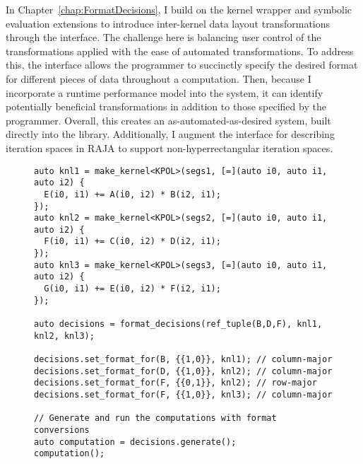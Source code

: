 In Chapter~\ref{chap:FormatDecisions}, I build on the kernel wrapper and symbolic evaluation extensions to introduce inter-kernel data layout transformations through the \FormatDecisions{} interface.
The challenge here is balancing user control of the transformations applied with the ease of automated transformations.
To address this, the interface allows the programmer to succinctly specify the desired format for different pieces of data throughout a computation.
Then, because I incorporate a runtime performance model into the system, it can identify potentially beneficial transformations in addition to those specified by the programmer.
Overall, this creates an as-automated-as-desired system, built directly into the library.
Additionally, I augment the interface for describing iteration spaces in RAJA to support non-hyperrectangular iteration spaces.
\begin{figure}
\begin{lstlisting}[caption={Changing data layouts for three Views in the \textsc{3mm} benchmark using \FormatDecisions.},
  label={Intro:FormatDecisions3MM}]
auto knl1 = make_kernel<KPOL>(segs1, [=](auto i0, auto i1, auto i2) {
  E(i0, i1) += A(i0, i2) * B(i2, i1);
});
auto knl2 = make_kernel<KPOL>(segs2, [=](auto i0, auto i1, auto i2) {
  F(i0, i1) += C(i0, i2) * D(i2, i1);
});
auto knl3 = make_kernel<KPOL>(segs3, [=](auto i0, auto i1, auto i2) {
  G(i0, i1) += E(i0, i2) * F(i2, i1);
});

auto decisions = format_decisions(ref_tuple(B,D,F), knl1, knl2, knl3);

decisions.set_format_for(B, {{1,0}}, knl1); // column-major
decisions.set_format_for(D, {{1,0}}, knl2); // column-major
decisions.set_format_for(F, {{0,1}}, knl2); // row-major
decisions.set_format_for(F, {{1,0}}, knl3); // column-major

// Generate and run the computations with format conversions
auto computation = decisions.generate();
computation();
\end{lstlisting}
\end{figure}

